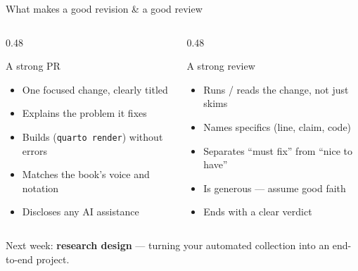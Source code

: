 \documentclass[9pt,aspectratio=169]{beamer}
\begin{document}
\begin{frame}{What makes a good revision \& a good review}
    \begin{columns}[T]
        \begin{column}{0.48\textwidth}
            \begin{block}{A strong PR}
                \begin{itemize}\small
                    \item One focused change, clearly titled
                    \item Explains the problem it fixes
                    \item Builds (\texttt{quarto render}) without errors
                    \item Matches the book's voice and notation
                    \item Discloses any AI assistance
                \end{itemize}
            \end{block}
        \end{column}
        \begin{column}{0.48\textwidth}
            \begin{block}{A strong review}
                \begin{itemize}\small
                    \item Runs / reads the change, not just skims
                    \item Names specifics (line, claim, code)
                    \item Separates ``must fix'' from ``nice to have''
                    \item Is generous --- assume good faith
                    \item Ends with a clear verdict
                \end{itemize}
            \end{block}
        \end{column}
    \end{columns}
    \vspace{0.5em}
    \centering\small Next week: \textbf{research design} --- turning your automated collection into an end-to-end project.
\end{frame}
\end{document}
